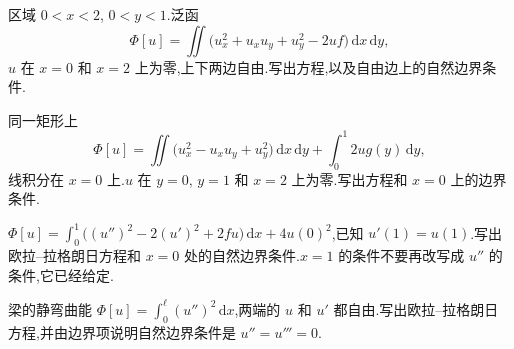 \begin{problemset}
\item 区域 $0<x<2$, $0<y<1$.泛函
\begin{equation*}
  \Phi[u]=\iint\bigl(u_x^2+u_x u_y+u_y^2-2uf\bigr)\,\mathrm{d}x\,\mathrm{d}y,
\end{equation*}
$u$ 在 $x=0$ 和 $x=2$ 上为零,上下两边自由.写出方程,以及自由边上的自然边界条件.

\item 同一矩形上
\begin{equation*}
  \Phi[u]=\iint\bigl(u_x^2-u_x u_y+u_y^2\bigr)\,\mathrm{d}x\,\mathrm{d}y
  +\int_0^1 2ug(y)\,\mathrm{d}y,
\end{equation*}
线积分在 $x=0$ 上.$u$ 在 $y=0$, $y=1$ 和 $x=2$ 上为零.写出方程和 $x=0$ 上的边界条件.

\item $\Phi[u]=\int_0^1\bigl((u'')^2-2(u')^2+2f u\bigr)\,\mathrm{d}x+4u(0)^2$,已知 $u'(1)=u(1)$.写出欧拉--拉格朗日方程和 $x=0$ 处的自然边界条件.$x=1$ 的条件不要再改写成 $u''$ 的条件,它已经给定.

\item 梁的静弯曲能 $\Phi[u]=\int_0^{\ell}(u'')^2\,\mathrm{d}x$,两端的 $u$ 和 $u'$ 都自由.写出欧拉--拉格朗日方程,并由边界项说明自然边界条件是 $u''=u'''=0$.
\end{problemset}
